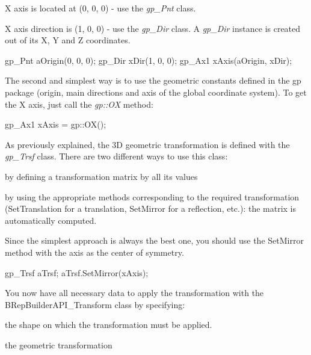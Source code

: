 \begin{DoxyItemize}
\item X axis is located at (0, 0, 0) -\/ use the {\itshape gp\+\_\+\+Pnt} class.
\item X axis direction is (1, 0, 0) -\/ use the {\itshape gp\+\_\+\+Dir} class. A {\itshape gp\+\_\+\+Dir} instance is created out of its X, Y and Z coordinates.
\end{DoxyItemize}


\begin{DoxyCode}
gp\_Pnt aOrigin(0, 0, 0);
gp\_Dir xDir(1, 0, 0);
gp\_Ax1 xAxis(aOrigin, xDir);
\end{DoxyCode}


The second and simplest way is to use the geometric constants defined in the gp package (origin, main directions and axis of the global coordinate system). To get the X axis, just call the {\itshape gp\+::\+OX} method\+:


\begin{DoxyCode}
gp\_Ax1 xAxis = gp::OX();
\end{DoxyCode}


As previously explained, the 3D geometric transformation is defined with the {\itshape gp\+\_\+\+Trsf} class. There are two different ways to use this class\+:


\begin{DoxyItemize}
\item by defining a transformation matrix by all its values
\item by using the appropriate methods corresponding to the required transformation (Set\+Translation for a translation, Set\+Mirror for a reflection, etc.)\+: the matrix is automatically computed.
\end{DoxyItemize}

Since the simplest approach is always the best one, you should use the Set\+Mirror method with the axis as the center of symmetry.


\begin{DoxyCode}
gp\_Trsf aTrsf;
aTrsf.SetMirror(xAxis);
\end{DoxyCode}


You now have all necessary data to apply the transformation with the B\+Rep\+Builder\+A\+P\+I\+\_\+\+Transform class by specifying\+:


\begin{DoxyItemize}
\item the shape on which the transformation must be applied.
\item the geometric transformation
\end{DoxyItemize}


